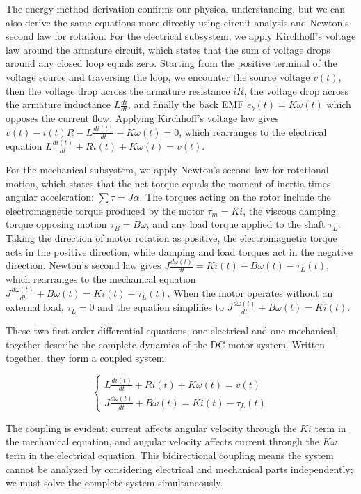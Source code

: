 The energy method derivation confirms our physical understanding, but we can also derive the same equations more directly using circuit analysis and Newton's second law for rotation. For the electrical subsystem, we apply Kirchhoff's voltage law around the armature circuit, which states that the sum of voltage drops around any closed loop equals zero. Starting from the positive terminal of the voltage source and traversing the loop, we encounter the source voltage $v(t)$, then the voltage drop across the armature resistance $iR$, the voltage drop across the armature inductance $L \frac{di}{dt}$, and finally the back EMF $e_b(t) = K\omega(t)$ which opposes the current flow. Applying Kirchhoff's voltage law gives $v(t) - i(t)R - L \frac{di(t)}{dt} - K\omega(t) = 0$, which rearranges to the electrical equation $L \frac{di(t)}{dt} + Ri(t) + K\omega(t) = v(t)$.

For the mechanical subsystem, we apply Newton's second law for rotational motion, which states that the net torque equals the moment of inertia times angular acceleration: $\sum \tau = J \alpha$. The torques acting on the rotor include the electromagnetic torque produced by the motor $\tau_m = K i$, the viscous damping torque opposing motion $\tau_B = B \omega$, and any load torque applied to the shaft $\tau_L$. Taking the direction of motor rotation as positive, the electromagnetic torque acts in the positive direction, while damping and load torques act in the negative direction. Newton's second law gives $J \frac{d\omega(t)}{dt} = K i(t) - B \omega(t) - \tau_L(t)$, which rearranges to the mechanical equation $J \frac{d\omega(t)}{dt} + B \omega(t) = K i(t) - \tau_L(t)$. When the motor operates without an external load, $\tau_L = 0$ and the equation simplifies to $J \frac{d\omega(t)}{dt} + B \omega(t) = K i(t)$.

These two first-order differential equations, one electrical and one mechanical, together describe the complete dynamics of the DC motor system. Written together, they form a coupled system:

$$
\begin{cases}
L \frac{di(t)}{dt} + Ri(t) + K\omega(t) = v(t) \\
J \frac{d\omega(t)}{dt} + B \omega(t) = K i(t) - \tau_L(t)
\end{cases}
$$

The coupling is evident: current affects angular velocity through the $K i$ term in the mechanical equation, and angular velocity affects current through the $K\omega$ term in the electrical equation. This bidirectional coupling means the system cannot be analyzed by considering electrical and mechanical parts independently; we must solve the complete system simultaneously.

